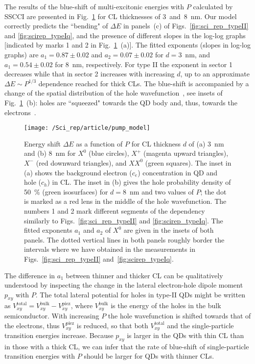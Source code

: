 The results of the blue-shift of multi-excitonic energies with $P$ calculated by SSCCI are presented in Fig.~\ref{fig:scirep_pumpmodel} for CL thicknesses of 3~and~8~nm. Our model correctly predicts the ``bending" of $\Delta E$ in panels~(c) of Figs.~\ref{fig:sci_rep_typeII} and \ref{fig:scirep_typeIq}, and the presence of different slopes in the log-log graphs [indicated by marks 1 and 2 in Fig.~\ref{fig:scirep_pumpmodel}~(a)].  The fitted exponents (slopes in log-log graphs) are $a_1=0.87\pm0.02$ and $a_2=0.07\pm0.02$ for $d=$3~nm, and $a_1=0.54\pm0.02$ for 8~nm, respectively. For type II the exponent in sector 1 decreases while that in sector 2 increases with increasing $d$, up to an approximate $\Delta E\sim P^{1/3}$ dependence reached for thick CLs. The blue-shift is accompanied by a change of the spatial distribution of the hole wavefunction~\cite{Gradkowski2012}, see insets of Fig.~\ref{fig:scirep_pumpmodel}~(b): holes are ``squeezed" towards the QD body and, thus, towards the electrons~\cite{Gradkowski2012,Llorens2015}. 
%
\begin{figure}
	\centering
	\texttt{[image: /Sci\_rep/article/pump\_model]}
	\caption{Energy shift $\Delta E$ as a function of $P$ for CL thickness $d$ of (a) 3~nm and (b) 8~nm for $X^0$ (blue circles), $X^+$ (magenta upward triangles), $X^-$ (red downward triangles), and $XX^0$ (green squares). The inset in (a) shows the background electron ($c_e$) concentration in QD and hole ($c_h$) in CL. The inset in (b) gives the hole probability density of 50~\% (green isosurfaces) for $d=8$~nm and two values of $P$; the dot is marked as a red lens in the middle of the hole wavefunction. The numbers 1 and 2 mark different segments of the dependency similarly to Figs.~\ref{fig:sci_rep_typeII} and \ref{fig:scirep_typeIq}. The fitted exponents $a_1$ and $a_2$ of $X^0$ are given in the insets of both panels. The dotted vertical lines in both panels roughly border the intervals where we have obtained in the measurements in Figs.~\ref{fig:sci_rep_typeII}  and~\ref{fig:scirep_typeIq}.}
	\label{fig:scirep_pumpmodel}
\end{figure}

The difference in $a_1$ between thinner and thicker CL can be qualitatively understood by inspecting the change in the lateral electron-hole dipole moment $p_{xy}$ with $P$. The total lateral potential for holes in type-II QDs might be written as $V_{xy}^\mathrm{total}=V_{xy}^\mathrm{bulk}-V^{\mathrm{piez}}_{xy}$, where $V^{\mathrm{bulk}}_{xy}$ is the energy of the holes in the bulk semiconductor. With increasing $P$ the hole wavefunction is shifted towards that of the electrons, thus $V^{\mathrm{piez}}_{xy}$ is reduced, so that both $V^{\mathrm{total}}_{xy}$ and the single-particle transition energies increase. Because $p_{xy}$ is larger in the QDs with thin CL than in those with a thick CL, we can infer that the rate of blue-shift of single-particle transition energies with $P$ should be larger for QDs with thinner CLs.

